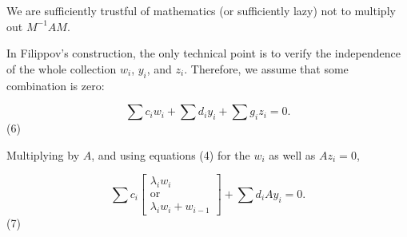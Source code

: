 We are sufficiently trustful of mathematics (or sufficiently lazy) not to multiply out \(M^{-1}AM\).

In Filippov's construction, the only technical point is to verify the independence of the whole collection \(w_{i}\), \(y_{i}\), and \(z_{i}\). Therefore, we assume that some combination is zero:

\[\sum c_{i}w_{i}+\sum d_{i}y_{i}+\sum g_{i}z_{i}=0.\] (6)

Multiplying by \(A\), and using equations (4) for the \(w_{i}\) as well as \(Az_{i}=0\),

\[\sum c_{i}\begin{bmatrix}\lambda_{i}w_{i}\\ \text{or}\\ \lambda_{i}w_{i}+w_{i-1}\end{bmatrix}+\sum d_{i}Ay_{i}=0.\] (7) 
